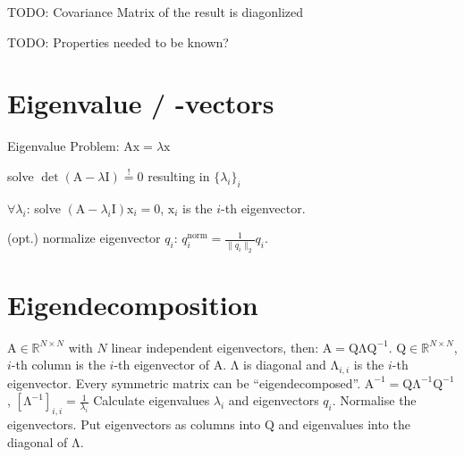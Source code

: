 \documentclass[a4paper, 11pt, landscape]{article}
\newcommand{\matr}[1]{\boldsymbol{\mathrm{#1}}}
\begin{document}
\begin{multicols*}{3}
\begin{compactitem}
	\item TODO: Covariance Matrix of the result is diagonlized
	\item TODO: Properties needed to be known?
\end{compactitem}

\section{Eigenvalue / -vectors}
Eigenvalue Problem: $\matr{Ax} = \lambda \matr{x}$
\begin{compactenum}
	\item solve $\operatorname{det}(\matr{A} - \lambda \matr{I}) \overset{!}{=} 0$ resulting in $\{\lambda_i\}_i$
	\item $\forall \lambda_i$:
		solve $(\matr{A} - \lambda_i \matr{I}) \matr{x}_i = \matr{0}$, $\matr{x}_i$ is the $i$-th eigenvector.
	\item (opt.) normalize eigenvector $q_i$: $q_i^{\text{norm}} = \frac{1}{\|q_i\|_2} q_i$.
\end{compactenum}

\section{Eigendecomposition}
$\matr{A} \in \mathbb{R}^{N \times N}$ with $N$ linear independent eigenvectors, then: $\matr{A} = \matr{Q \Lambda Q}^{-1}$. $\matr{Q} \in \mathbb{R}^{N \times N}$, $i$-th column is the $i$-th eigenvector of $\matr{A}$. $\matr{\Lambda}$ is diagonal and $\matr{\Lambda}_{i,i}$ is the $i$-th eigenvector. Every symmetric matrix can be ``eigendecomposed''. 
$\matr{A}^{-1} = \matr{Q} \matr{\Lambda}^{-1} \matr{Q}^{-1}$, $\left[ \matr{\Lambda}^{-1} \right]_{i,i} = \frac{1}{\lambda_i}$ 
Calculate eigenvalues $\lambda_i$ and eigenvectors $q_i$. Normalise the eigenvectors. Put eigenvectors as columns into $\matr{Q}$ and eigenvalues into the diagonal of $\matr{\Lambda}$.


\end{multicols*}
\end{document}
